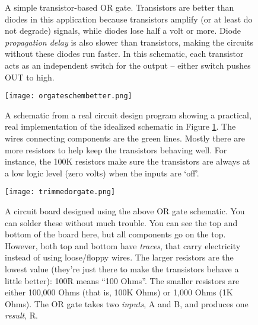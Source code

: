 
\begin{figure}[h!]
\begin{center}

\caption{A simple transistor-based OR gate. Transistors are better than diodes in this application because transistors amplify (or at least do not degrade) signals, while diodes lose half a volt or more. Diode \emph{propagation delay} is also slower than transistors, making the circuits without these diodes run faster. In this schematic, each transistor acts as an independent switch for the output -- either switch pushes OUT to high.}
\label{Fig:npnorgate}
\end{center}
\end{figure}

\begin{figure}[h!]
\begin{center}
\texttt{[image: orgateschembetter.png]}
\caption{A schematic from a real circuit design program showing a practical, real implementation of the idealized schematic in Figure \ref{Fig:npnorgate}. The wires connecting components are the green lines. Mostly there are more resistors to help keep the transistors behaving well. For instance, the 100K resistors make sure the transistors are always at a low logic level (zero volts) when the inputs are `off'.}
\label{Fig:orgateeagleschematic}
\end{center}
\end{figure}




\begin{figure}[h!]
\begin{center}
\texttt{[image: trimmedorgate.png]}
\caption{A circuit board designed using the above OR gate schematic. You can solder these without much trouble. You can see the top and bottom of the board here, but all components go on the top. However, both top and bottom have \emph{traces}, that carry electricity instead of using loose/floppy wires. The larger resistors are the lowest value (they're just there to make the transistors behave a little better): 100R means ``100 Ohms''. The smaller resistors are either 100,000 Ohms (that is, 100K Ohms) or 1,000 Ohms (1K Ohms). The OR gate takes two \emph{inputs}, A and B, and produces one \emph{result}, R.}
\end{center}
\end{figure}





